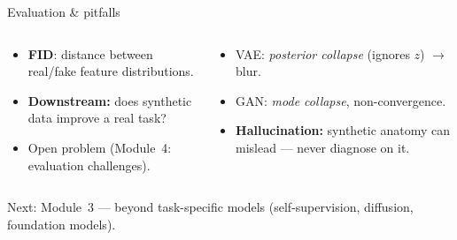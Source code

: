 \documentclass[
11pt,notheorems,hyperref={pdfauthor=whatever}
]{beamer}
\begin{document}
\begin{frame}{Evaluation \& pitfalls}
\small
\begin{columns}[T,onlytextwidth]
    \begin{tcolorbox}[medicalglass, title=\textbf{\color{accGreen}Evaluation is hard}]
    \begin{itemize}\small\setlength\itemsep{0.3em}
        \item \textbf{FID}: distance between real/fake feature distributions.
        \item \textbf{Downstream:} does synthetic data improve a real task?
        \item Open problem (Module~4: evaluation challenges).
    \end{itemize}
    \end{tcolorbox}
    \begin{tcolorbox}[medicalglass, title=\textbf{\color{accCoral}Pitfalls}]
    \begin{itemize}\small\setlength\itemsep{0.3em}
        \item VAE: \emph{posterior collapse} (ignores $z$) $\to$ blur.
        \item GAN: \emph{mode collapse}, non-convergence.
        \item \textbf{Hallucination:} synthetic anatomy can mislead --- never diagnose on it.
    \end{itemize}
    \end{tcolorbox}
\end{columns}
\vfill
{\footnotesize \textcolor{gray!55}{Next: Module~3 --- beyond task-specific models (self-supervision, diffusion, foundation models).}}
\end{frame}
\end{document}
